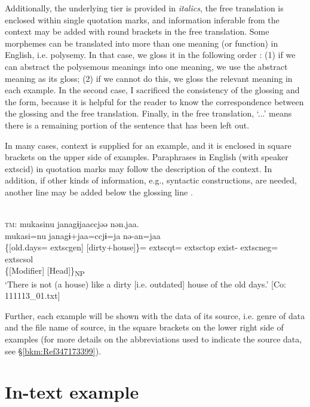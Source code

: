 Additionally, the underlying tier is provided in \textit{italics}, the free translation is enclosed within single quotation marks, and information inferable from the context may be added with round brackets in the free translation. Some morphemes can be translated into more than one meaning (or function) in English, i.e. polysemy. In that case, we gloss it in the following order \citep[cf.][11--12]{Lehmann2004}: (1) if we can abstract the polysemous meanings into one meaning, we use the abstract meaning as its gloss; (2) if we cannot do this, we gloss the relevant meaning in each example. In the second case, I sacrificed the consistency of the glossing and the form, because it is helpful for the reader to know the correspondence between the glossing and the free translation. Finally, in the free translation, ‘...’ means there is a remaining portion of the sentence that has been left out.

In many cases, context is supplied for an example, and it is enclosed in square brackets on the upper side of examples. Paraphrases in English (with speaker 	extsc{id}) in quotation marks may follow the description of the context. In addition, if other kinds of information, e.g., syntactic constructions, are needed, another line may be added below the glossing line \citep[cf.][4--5]{Lehmann2004}.

\ea{}\\
	\textsc{tm}: \gllll mukasinu janagɨjaaccjəə nən.jaa.\\
          mukasi=nu janagɨ+jaa=ccjɨ=ja nə-an=jaa\\
          \{[old.days=	extsc{gen}] [dirty+house]\}=	extsc{qt}=	extsc{top} exist-	extsc{neg}=	extsc{sol}\\
          \{[Modifier] [Head]\}\textsubscript{NP}\\
   \glt{} ‘There is not (a house) like a dirty [i.e. outdated] house of the old days.’ [Co: 111113\_01.txt]

\z

Further, each example will be shown with the data of its source, i.e. genre of data and the file name of source, in the square brackets on the lower right side of examples (for more details on the abbreviations used to indicate the source data, see §\ref{bkm:Ref347173399}).

\section*{In-text example}

